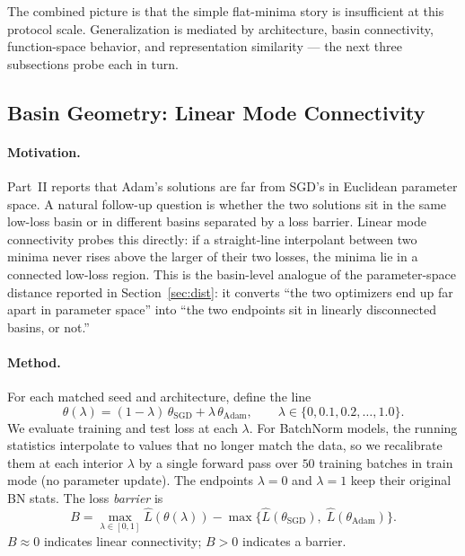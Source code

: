 \documentclass[11pt]{article}
\begin{document}
The combined picture is that the simple flat-minima story is insufficient at this protocol scale. Generalization is mediated by architecture, basin connectivity, function-space behavior, and representation similarity --- the next three subsections probe each in turn.

\FloatBarrier

\subsection{Basin Geometry: Linear Mode Connectivity}
\label{sec:mode-connectivity}

\paragraph{Motivation.} Part~II reports that Adam's solutions are far from SGD's in Euclidean parameter space. A natural follow-up question is whether the two solutions sit in the same low-loss basin or in different basins separated by a loss barrier. Linear mode connectivity \cite{garipov2018loss,frankle2020linear} probes this directly: if a straight-line interpolant between two minima never rises above the larger of their two losses, the minima lie in a connected low-loss region. This is the basin-level analogue of the parameter-space distance reported in Section~\ref{sec:dist}: it converts ``the two optimizers end up far apart in parameter space'' into ``the two endpoints sit in linearly disconnected basins, or not.''

\paragraph{Method.} For each matched seed and architecture, define the line
\[
\theta(\lambda) = (1-\lambda)\,\theta_{\mathrm{SGD}} + \lambda\,\theta_{\mathrm{Adam}},
\qquad \lambda\in\{0,0.1,0.2,\dots,1.0\}.
\]
We evaluate training and test loss at each $\lambda$. For BatchNorm models, the running statistics interpolate to values that no longer match the data, so we recalibrate them at each interior $\lambda$ by a single forward pass over $50$ training batches in train mode (no parameter update). The endpoints $\lambda=0$ and $\lambda=1$ keep their original BN stats. The loss \emph{barrier} is
\[
B = \max_{\lambda\in[0,1]} \widehat L(\theta(\lambda))
   - \max\big\{ \widehat L(\theta_{\mathrm{SGD}}),\; \widehat L(\theta_{\mathrm{Adam}}) \big\}.
\]
$B\approx 0$ indicates linear connectivity; $B>0$ indicates a barrier.
\end{document}
